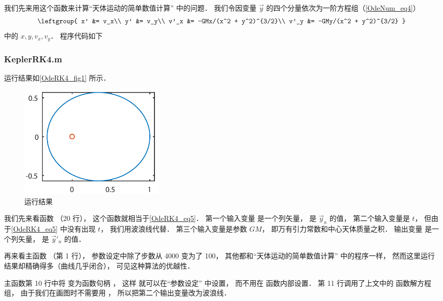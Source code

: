 我们先来用这个函数来计算“天体运动的简单数值计算” 中的问题． 我们令因变量 $\vec y$ 的四个分量依次为一阶方程组（\autoref{OdeNum_eq4}）
\begin{equation}\label{OdeRK4_eq5}
\leftgroup{
x' &= v_x\\
y' &= v_y\\
v'_x &= -GMx/(x^2 + y^2)^{3/2}\\
v'_y &= -GMy/(x^2 + y^2)^{3/2}
}\end{equation}
中的 $x, y, v_x, v_y$． 程序代码如下

\subsubsection{KeplerRK4.m}


运行结果如\autoref{OdeRK4_fig1} 所示．

\begin{figure}[ht]
\centering
\includegraphics[width=7cm]{./figures/OdeRK4.pdf}
\caption{运行结果} \label{OdeRK4_fig1}
\end{figure}

我们先来看函数  （20 行）， 这个函数就相当于\autoref{OdeRK4_eq5}． 第一个输入变量  是一个列矢量， 是 $\vec y_n$ 的值， 第二个输入变量是 $t$， 但由于\autoref{OdeRK4_eq5} 中没有出现 $t$， 我们用波浪线代替． 第三个输入变量是参数 $GM$， 即万有引力常数和中心天体质量之积． 输出变量  是一个列矢量， 是 $\vec y'_n$ 的值．

再来看主函数  （第 1 行）， 参数设定中除了步数从 4000 变为了 100， 其他都和“天体运动的简单数值计算” 中的程序一样， 然而这里运行结果却精确得多（曲线几乎闭合）， 可见这种算法的优越性．

主函数第 10 行中将  变为函数句柄 ， 这样  就可以在“参数设定” 中设置， 而不用在  函数内部设置． 第 11 行调用了上文中的  函数解方程组， 由于我们在画图时不需要用 ， 所以把第二个输出变量改为波浪线．

